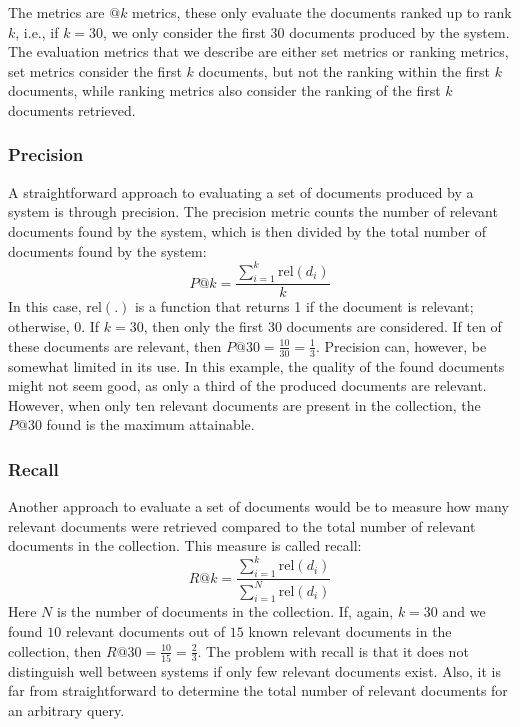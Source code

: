 The metrics are $@k$ metrics, these only evaluate the documents ranked up to rank $k$, i.e., if $k=30$, we only consider the first $30$ documents produced by the system. The evaluation metrics that we describe are either set metrics or ranking metrics, set metrics consider the first $k$ documents, but not the ranking within the first $k$ documents, while ranking metrics also consider the ranking of the first $k$ documents retrieved.

\subsubsection{Precision}
A straightforward approach to evaluating a set of documents produced by a system is through precision. The precision metric counts the number of relevant documents found by the system, which is then divided by the total number of documents found by the system:
\begin{equation}
	\textit{P}@k = \frac{\sum_{i=1}^k\text{rel}\left(d_i\right)}{k}
\end{equation}
In this case, $\text{rel}(.)$ is a function that returns 1 if the document is relevant; otherwise, 0.
If $k=30$, then only the first $30$ documents are considered. If ten of these documents are relevant, then $P@30 = \frac{10}{30} = \frac{1}{3}$. Precision can, however, be somewhat limited in its use. In this example, the quality of the found documents might not seem good, as only a third of the produced documents are relevant. However, when only ten relevant documents are present in the collection, the $P@30$ found is the maximum attainable.  

\subsubsection{Recall}
Another approach to evaluate a set of documents would be to measure how many relevant documents were retrieved compared to the total number of relevant documents in the collection. This measure is called recall: 
\begin{equation}
	\textit{R}@k = \frac{\sum_{i=1}^k\text{rel}\left(d_i\right)}{\sum_{i=1}^N\text{rel}\left(d_i\right)}
\end{equation}
Here $N$ is the number of documents in the collection. If, again, $k=30$ and we found $10$ relevant documents out of $15$ known relevant documents in the collection, then $R@30 = \frac{10}{15} = \frac{2}{3}$. The problem with recall is that it does not distinguish well between systems if only few relevant documents exist. Also, it is far from straightforward to determine the total number of relevant documents for an arbitrary query.

